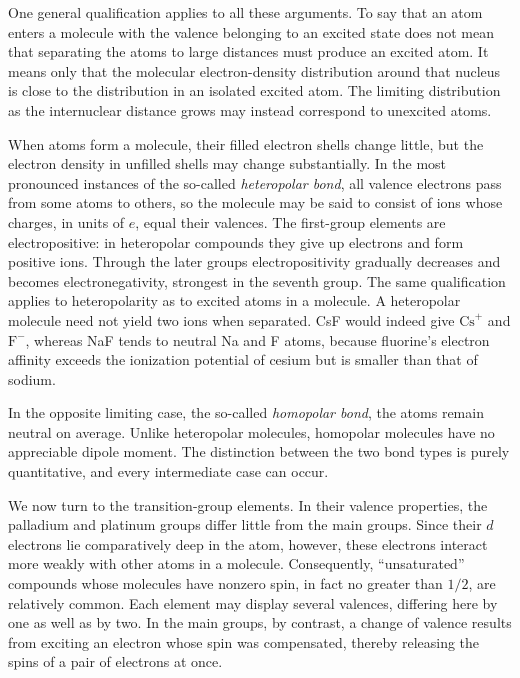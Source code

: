 One general qualification applies to all these arguments. To say that an atom enters a molecule with the valence belonging to an excited state does not mean that separating the atoms to large distances must produce an excited atom. It means only that the molecular electron-density distribution around that nucleus is close to the distribution in an isolated excited atom. The limiting distribution as the internuclear distance grows may instead correspond to unexcited atoms.

When atoms form a molecule, their filled electron shells change little, but the electron density in unfilled shells may change substantially. In the most pronounced instances of the so-called \emph{heteropolar bond}, all valence electrons pass from some atoms to others, so the molecule may be said to consist of ions whose charges, in units of $e$, equal their valences. The first-group elements are electropositive: in heteropolar compounds they give up electrons and form positive ions. Through the later groups electropositivity gradually decreases and becomes electronegativity, strongest in the seventh group. The same qualification applies to heteropolarity as to excited atoms in a molecule. A heteropolar molecule need not yield two ions when separated. CsF would indeed give $\mathrm{Cs}^+$ and $\mathrm F^-$, whereas NaF tends to neutral Na and F atoms, because fluorine's electron affinity exceeds the ionization potential of cesium but is smaller than that of sodium.

In the opposite limiting case, the so-called \emph{homopolar bond}, the atoms remain neutral on average. Unlike heteropolar molecules, homopolar molecules have no appreciable dipole moment. The distinction between the two bond types is purely quantitative, and every intermediate case can occur.

We now turn to the transition-group elements. In their valence properties, the palladium and platinum groups differ little from the main groups. Since their $d$ electrons lie comparatively deep in the atom, however, these electrons interact more weakly with other atoms in a molecule. Consequently, ``unsaturated'' compounds whose molecules have nonzero spin, in fact no greater than $1/2$, are relatively common. Each element may display several valences, differing here by one as well as by two. In the main groups, by contrast, a change of valence results from exciting an electron whose spin was compensated, thereby releasing the spins of a pair of electrons at once.

